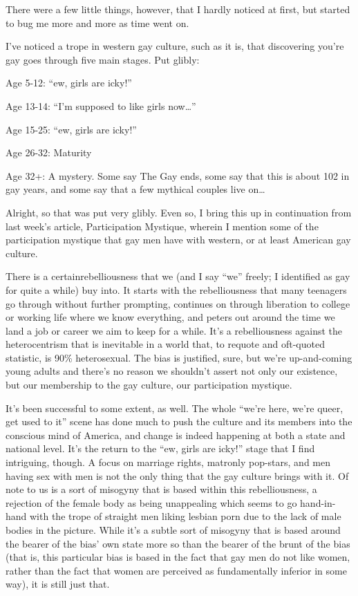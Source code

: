 There were a few little things, however, that I hardly noticed at first, but started to bug me more and more as time went on.

I've noticed a trope in western gay culture, such as it is, that discovering you're gay goes through five main stages. Put glibly:

Age 5-12: ``ew, girls are icky!''

Age 13-14: ``I'm supposed to like girls now\ldots{}''

Age 15-25: ``ew, girls are icky!''

Age 26-32: Maturity

Age 32+: A mystery. Some say The Gay ends, some say that this is about 102 in gay years, and some say that a few mythical couples live on\ldots{}

Alright, so that was put very glibly. Even so, I bring this up in continuation from last week's article, Participation Mystique, wherein I mention some of the participation mystique that gay men have with western, or at least American gay culture.

There is a certainrebelliousness that we (and I say ``we'' freely; I identified as gay for quite a while) buy into. It starts with the rebelliousness that many teenagers go through without further prompting, continues on through liberation to college or working life where we know everything, and peters out around the time we land a job or career we aim to keep for a while. It's a rebelliousness against the heterocentrism that is inevitable in a world that, to requote and oft-quoted statistic, is 90\% heterosexual. The bias is justified, sure, but we're up-and-coming young adults and there's no reason we shouldn't assert not only our existence, but our membership to the gay culture, our participation mystique.

It's been successful to some extent, as well. The whole ``we're here, we're queer, get used to it'' scene has done much to push the culture and its members into the conscious mind of America, and change is indeed happening at both a state and national level. It's the return to the ``ew, girls are icky!'' stage that I find intriguing, though. A focus on marriage rights, matronly pop-stars, and men having sex with men is not the only thing that the gay culture brings with it. Of note to us is a sort of misogyny that is based within this rebelliousness, a rejection of the female body as being unappealing which seems to go hand-in-hand with the trope of straight men liking lesbian porn due to the lack of male bodies in the picture. While it's a subtle sort of misogyny that is based around the bearer of the bias' own state more so than the bearer of the brunt of the bias (that is, this particular bias is based in the fact that gay men do not like women, rather than the fact that women are perceived as fundamentally inferior in some way), it is still just that.

